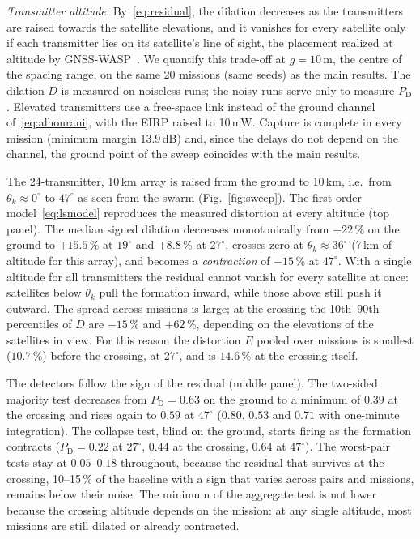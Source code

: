 \documentclass[conference]{IEEEtran}
\newcommand{\PD}{P_{\mathrm{D}}}
\begin{document}
\emph{Transmitter altitude.}
By~\eqref{eq:residual}, the dilation decreases as the transmitters are
raised towards the satellite elevations, and it vanishes for every
satellite only if each transmitter lies on its satellite's line of sight,
the placement realized at altitude by
GNSS-WASP~\cite{tibaldo2025gnsswasp}. We quantify this trade-off at
$g=10$\,m, the centre of the spacing range, on the same 20 missions
(same seeds) as the main results. The dilation $D$ is measured on
noiseless runs; the noisy runs serve only to measure $\PD$. Elevated
transmitters use a free-space link instead of the ground channel
of~\eqref{eq:alhourani}, with the EIRP raised to 10\,mW. Capture is
complete in every mission (minimum margin 13.9\,dB) and, since the
delays do not depend on the channel, the ground point of the sweep
coincides with the main results.

The 24-transmitter, 10\,km array is raised from the ground to 10\,km,
i.e.\ from $\theta_k\approx0^\circ$ to $47^\circ$ as seen from the swarm
(Fig.~\ref{fig:sweep}). The first-order model~\eqref{eq:lsmodel}
reproduces the measured distortion at every altitude (top panel). The
median signed dilation decreases monotonically from $+22$\,\% on the
ground to $+15.5$\,\% at $19^\circ$ and $+8.8$\,\% at $27^\circ$,
crosses zero at $\theta_k\approx36^\circ$ (7\,km of altitude for this
array), and becomes a \emph{contraction} of $-15$\,\% at $47^\circ$.
With a single altitude for all transmitters the residual cannot vanish
for every satellite at once: satellites below $\theta_k$ pull the
formation inward, while those above still push it outward. The spread
across missions is large; at the crossing the 10th--90th percentiles of
$D$ are $-15$\,\% and $+62$\,\%, depending on the elevations of the
satellites in view. For this reason the distortion $E$ pooled over
missions is smallest ($10.7$\,\%) before the crossing, at $27^\circ$,
and is $14.6$\,\% at the crossing itself.

The detectors follow the sign of the residual (middle panel). The
two-sided majority test decreases from $\PD=0.63$ on the ground to a
minimum of $0.39$ at the crossing and rises again to $0.59$ at
$47^\circ$ ($0.80$, $0.53$ and $0.71$ with one-minute integration). The
collapse test, blind on the ground, starts firing as the formation
contracts ($\PD=0.22$ at $27^\circ$, $0.44$ at the crossing, $0.64$ at
$47^\circ$). The worst-pair tests stay at $0.05$--$0.18$ throughout,
because the residual that survives at the crossing, 10--15\,\% of the
baseline with a sign that varies across pairs and missions, remains
below their noise. The minimum of the aggregate test is not lower
because the crossing altitude depends on the mission: at any single
altitude, most missions are still dilated or already contracted.
\end{document}
